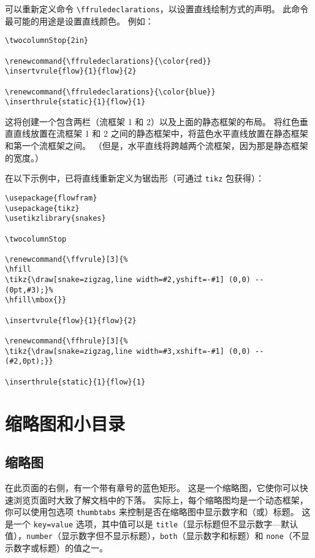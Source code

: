 \documentclass[a4paper]{book}%
\newcommand{\sty}[1]{\texttt{#1}}
\newcommand{\cmd}[1]{\texttt{#1}}
\begin{document}
可以重新定义命令 \verb|\ffruledeclarations|，以设置直线绘制方式的声明。 此命令最可能的用途是设置直线颜色。 例如：
\begin{lstlisting}[backgroundcolor=\color{white}]
\twocolumnStop{2in}

\renewcommand{\ffruledeclarations}{\color{red}}
\insertvrule{flow}{1}{flow}{2}

\renewcommand{\ffruledeclarations}{\color{blue}}
\inserthrule{static}{1}{flow}{1}
\end{lstlisting}
这将创建一个包含两栏（流框架 1 和 2）以及上面的静态框架的布局。 将红色垂直直线放置在流框架 1 和 2 之间的静态框架中，将蓝色水平直线放置在静态框架和第一个流框架之间。 （但是，水平直线将跨越两个流框架，因为那是静态框架的宽度。）

在以下示例中，已将直线重新定义为锯齿形（可通过 \sty{tikz} 包获得）：
\begin{lstlisting}[backgroundcolor=\color{white}]
\usepackage{flowfram}
\usepackage{tikz}
\usetikzlibrary{snakes}

\twocolumnStop

\renewcommand{\ffvrule}[3]{%
\hfill
\tikz{\draw[snake=zigzag,line width=#2,yshift=-#1] (0,0) -- (0pt,#3);}%
\hfill\mbox{}}

\insertvrule{flow}{1}{flow}{2}

\renewcommand{\ffhrule}[3]{%
\tikz{\draw[snake=zigzag,line width=#3,xshift=-#1] (0,0) -- (#2,0pt);}}

\inserthrule{static}{1}{flow}{1}
\end{lstlisting}
\chapter{缩略图和小目录}%
\section{缩略图}\label{sec-6-1}%
在此页面的右侧，有一个带有章号的蓝色矩形。 这是一个缩略图，它使你可以快速浏览页面时大致了解文档中的下落。 实际上，每个缩略图均是一个动态框架，你可以使用包选项 \cmd{thumbtabs} 来控制是否在缩略图中显示数字和（或）标题。 这是一个 \cmd{key=value} 选项，其中值可以是 \cmd{title}（显示标题但不显示数字—默认值），\cmd{number}（显示数字但不显示标题），\cmd{both}（显示数字和标题）和 \cmd{none}（不显示数字或标题）的值之一。
\end{document}
